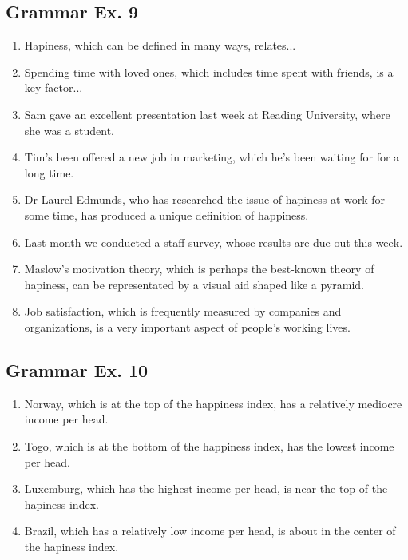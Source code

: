 \documentclass[12pt, a4paper, oneside]{article}
\begin{document}
  \subsection{Grammar Ex. 9}
  \begin{enumerate}[1.]
    \item Hapiness, which can be defined in many ways, relates...
    \item Spending time with loved ones, which includes time spent with friends, is a key factor...
    \item Sam gave an excellent presentation last week at Reading University, where she was a student.
    \item Tim's been offered a new job in marketing, which he's been waiting for for a long time.
    \item Dr Laurel Edmunds, who has researched the issue of hapiness at work for some time, has produced a unique definition of happiness.
    \item Last month we conducted a staff survey, whose results are due out this week.
    \item Maslow's motivation theory, which is perhaps the best-known theory of hapiness, can be representated by a visual aid shaped like a pyramid.
    \item Job satisfaction, which is frequently measured by companies and organizations, is a very important aspect of people's working lives.
  \end{enumerate} 

  \subsection{Grammar Ex. 10}
  \begin{enumerate}[1.]
    \item Norway, which is at the top of the happiness index, has a relatively mediocre income per head.
    \item Togo, which is at the bottom of the happiness index, has the lowest income per head.
    \item Luxemburg, which has the highest income per head, is near the top of the hapiness index.
    \item Brazil, which has a relatively low income per head, is about in the center of the hapiness index.
  \end{enumerate}
\end{document}
